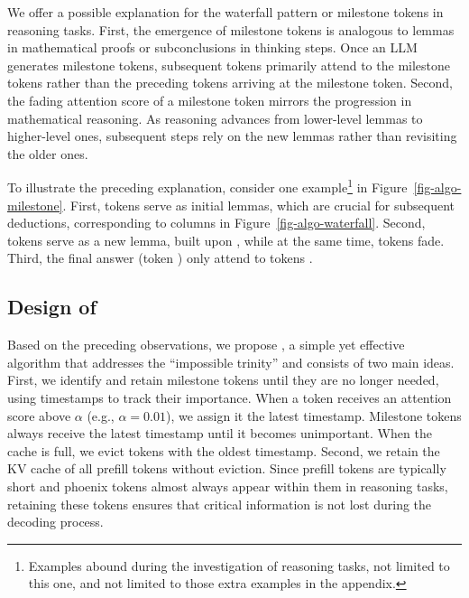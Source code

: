 We offer a possible explanation for the waterfall pattern or milestone tokens in reasoning tasks. First, the emergence of milestone tokens is analogous to lemmas in mathematical proofs or subconclusions in thinking steps. Once an LLM generates milestone tokens, subsequent tokens primarily attend to the milestone tokens rather than the preceding tokens arriving at the milestone token. Second, the fading attention score of a milestone token mirrors the progression in mathematical reasoning. As reasoning advances from lower-level lemmas to higher-level ones, subsequent steps rely on the new lemmas rather than revisiting the older ones.



To illustrate the preceding explanation, consider one example\footnote{Examples abound during the investigation of reasoning tasks, not limited to this one, and not limited to those extra examples in the appendix.} in Figure~\ref{fig-algo-milestone}. First, tokens  serve as initial lemmas, which are crucial for subsequent deductions, corresponding to  columns in Figure~\ref{fig-algo-waterfall}. Second, tokens  serve as a new lemma, built upon , while at the same time, tokens  fade. Third, the final answer (token ) only attend to tokens .






\subsection{Design of \algo}
\label{sec-algo-algo}


Based on the preceding observations, we propose \algo, a simple yet effective algorithm that addresses the ``impossible trinity'' and consists of two main ideas. First, we identify and retain milestone tokens until they are no longer needed, using timestamps to track their importance. When a token receives an attention score above $\alpha$ (e.g., $\alpha=0.01$), we assign it the latest timestamp. Milestone tokens always receive the latest timestamp until it becomes unimportant. When the cache is full, we evict tokens with the oldest timestamp. Second, we retain the KV cache of all prefill tokens without eviction. Since prefill tokens are typically short and phoenix tokens almost always appear within them in reasoning tasks, retaining these tokens ensures that critical information is not lost during the decoding process.


